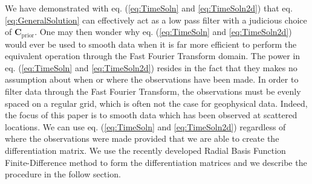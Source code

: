 \documentclass[10pt,a4paper]{article}
\begin{document}
We have demonstrated with eq. (\ref{eq:TimeSoln} and \ref{eq:TimeSoln2d}) that eq. \ref{eq:GeneralSolution} can effectively act as a low pass filter with a judicious choice of $\mathbf{C}_\mathrm{prior}$.  One may then wonder why eq. (\ref{eq:TimeSoln} and \ref{eq:TimeSoln2d}) would ever be used to smooth data when it is far more efficient to perform the equivalent operation through the Fast Fourier Transform domain.  The power in eq. (\ref{eq:TimeSoln} and \ref{eq:TimeSoln2d}) resides in the fact that they makes no assumption about when or where the observations have been made.  In order to filter data through the Fast Fourier Transform, the observations must be evenly spaced on a regular grid, which is often not the case for geophysical data.  Indeed,  the focus of this paper is to smooth data which has been observed at scattered locations.  We can use eq. (\ref{eq:TimeSoln} and \ref{eq:TimeSoln2d}) regardless of where the observations were made provided that we are able to create the differentiation matrix.  We use the recently developed Radial Basis Function Finite-Difference method to form the differentiation matrices and we describe the procedure in the follow section. 



  

 
\end{document}
